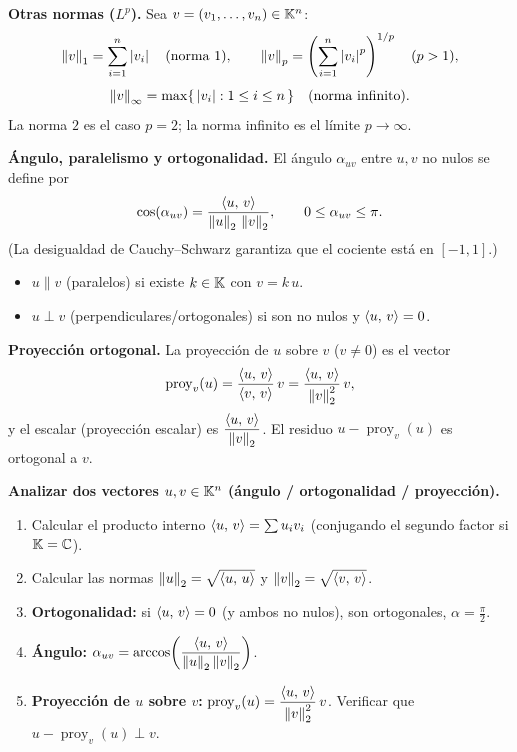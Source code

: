 \begin{teoria}
\textbf{Otras normas ($L^p$).} Sea $v = (v_1,\dots,v_n) \in \mathbb{K}^n$:
\[
\left\lVert v \right\rVert_1 = \sum_{i=1}^n \left\lvert v_i \right\rvert \quad (\text{norma 1}), \qquad
\left\lVert v \right\rVert_p = \left(\sum_{i=1}^n \left\lvert v_i \right\rvert^p\right)^{1/p} \quad (p > 1),
\]
\[
\left\lVert v \right\rVert_\infty = \max\{\, \left\lvert v_i \right\rvert : 1 \le i \le n \,\} \quad (\text{norma infinito}).
\]
La norma $2$ es el caso $p=2$; la norma infinito es el límite $p \to \infty$.
\end{teoria}

\begin{teoria}
\textbf{Ángulo, paralelismo y ortogonalidad.} El ángulo $\alpha_{uv}$ entre $u,v$ no nulos se define por
\[
\cos(\alpha_{uv}) = \frac{\left\langle u,\, v \right\rangle}{\left\lVert u \right\rVert_2\,\left\lVert v \right\rVert_2}, \qquad 0 \le \alpha_{uv} \le \pi.
\]
(La desigualdad de Cauchy--Schwarz garantiza que el cociente está en $[-1,1]$.)
\begin{itemize}
  \item $u \parallel v$ (paralelos) si existe $k \in \mathbb{K}$ con $v = k\,u$.
  \item $u \perp v$ (perpendiculares/ortogonales) si son no nulos y $\left\langle u,\, v \right\rangle = 0$.
\end{itemize}
\textbf{Proyección ortogonal.} La proyección de $u$ sobre $v$ ($v \neq 0$) es el vector
\[
\operatorname{proy}_v(u) = \frac{\left\langle u,\, v \right\rangle}{\left\langle v,\, v \right\rangle}\,v = \frac{\left\langle u,\, v \right\rangle}{\left\lVert v \right\rVert_2^2}\,v,
\]
y el escalar (proyección escalar) es $\dfrac{\left\langle u,\, v \right\rangle}{\left\lVert v \right\rVert_2}$. El residuo $u - \operatorname{proy}_v(u)$ es ortogonal a $v$.
\end{teoria}

\begin{receta}
\textbf{Analizar dos vectores $u,v \in \mathbb{K}^n$ (ángulo / ortogonalidad / proyección).}
\begin{enumerate}
  \item Calcular el producto interno $\left\langle u,\, v \right\rangle = \sum u_i v_i$ (conjugando el segundo factor si $\mathbb{K} = \mathbb{C}$).
  \item Calcular las normas $\left\lVert u \right\rVert_2 = \sqrt{\left\langle u,\, u \right\rangle}$ y $\left\lVert v \right\rVert_2 = \sqrt{\left\langle v,\, v \right\rangle}$.
  \item \textbf{Ortogonalidad:} si $\left\langle u,\, v \right\rangle=0$ (y ambos no nulos), son ortogonales, $\alpha = \tfrac{\pi}{2}$.
  \item \textbf{Ángulo:} $\alpha_{uv} = \arccos\!\left(\dfrac{\left\langle u,\, v \right\rangle}{\left\lVert u \right\rVert_2\left\lVert v \right\rVert_2}\right)$.
  \item \textbf{Proyección de $u$ sobre $v$:} $\operatorname{proy}_v(u) = \dfrac{\left\langle u,\, v \right\rangle}{\left\lVert v \right\rVert_2^2}\,v$. Verificar que $u - \operatorname{proy}_v(u) \perp v$.
\end{enumerate}
\end{receta}

